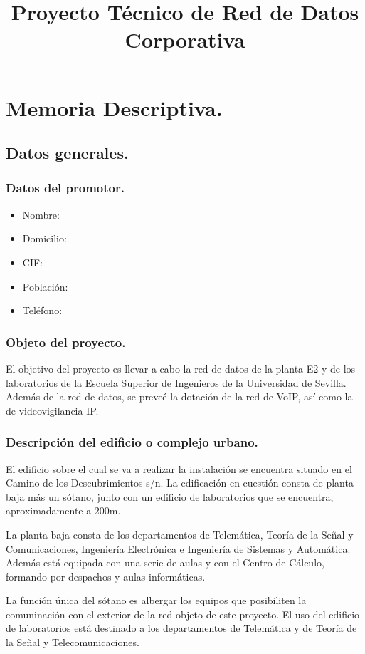 \documentclass[a4paper,10pt]{article}
\title{Proyecto T\'ecnico de Red de Datos Corporativa}
\author{}
\date{}
\begin{document}
\maketitle


\section{Memoria Descriptiva.}
\subsection{Datos generales.}
\subsubsection{Datos del promotor.}
\begin{itemize}
 \item Nombre:
 \item Domicilio:
 \item CIF:
 \item Población:
 \item Teléfono:
\end{itemize}

\subsubsection{Objeto del proyecto.}
El objetivo del proyecto es llevar a cabo la red de datos de la planta E2 y de los laboratorios 
de la Escuela Superior de Ingenieros de la Universidad de Sevilla. Además de la red de datos, 
se preveé la dotación de la red de VoIP, así como la de videovigilancia IP.
\subsubsection{Descripción del edificio o complejo urbano.}
El edificio sobre el cual se va a realizar la instalación se encuentra situado en el Camino de los
Descubrimientos s/n. La edificación en cuestión consta de planta baja más un sótano, junto con un
edificio de laboratorios que se encuentra, aproximadamente a 200m.

La planta baja consta de los departamentos de Telemática, Teoría de la Señal y Comunicaciones, 
Ingeniería Electrónica e Ingeniería de Sistemas y Automática. Además está equipada con una serie de
aulas y con el Centro de Cálculo, formando por despachos y aulas informáticas.

La función única del sótano es albergar los equipos que posibiliten la comuninación con el exterior
de la red objeto de este proyecto. El uso del edificio de laboratorios está destinado a los
departamentos de Telemática y de Teoría de la Señal y Telecomunicaciones.
\end{document}
